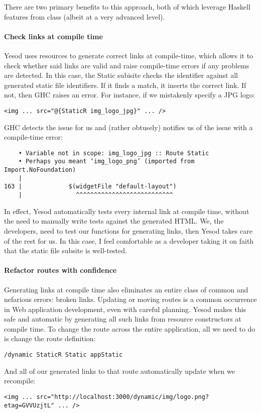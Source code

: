 There are two primary benefits to this approach, both of which leverage Haskell features from class (albeit at a very advanced level).

\paragraph{Check links at compile time} Yesod uses resources to generate correct links at compile-time, which allows it to check whether said links are valid and raise compile-time errors if any problems are detected. In this case, the Static subisite checks the identifier  against all generated static file identifiers. If it finds a match, it inserts the correct link. If not, then GHC raises an error. For instance, if we mistakenly specify a JPG logo:

\begin{Verbatim}
<img ... src="@{StaticR img_logo_jpg}" ... />
\end{Verbatim}

GHC detects the issue for us and (rather obtusely) notifies us of the issue with a compile-time error:

\begin{Verbatim}
    • Variable not in scope: img_logo_jpg :: Route Static
    • Perhaps you meant ‘img_logo_png’ (imported from Import.NoFoundation)
    |
163 |             $(widgetFile "default-layout")
    |               ^^^^^^^^^^^^^^^^^^^^^^^^^^^
\end{Verbatim}

In effect, Yesod automatically tests every internal link at compile time, without the need to manually write tests against the generated HTML. We, the developers, need to test our functions for generating links, then Yesod takes care of the rest for us. In this case, I feel comfortable as a developer taking it on faith that the static file subsite is well-tested.

\paragraph{Refactor routes with confidence} Generating links at compile time also eliminates an entire class of common and nefarious errors: broken links. Updating or moving routes is a common occurrence in Web application development, even with careful planning. Yesod makes this safe and automatic by generating all such links from resource constructors at compile time. To change the route across the entire application, all we need to do is change the route definition:

\begin{Verbatim}
/dynamic StaticR Static appStatic
\end{Verbatim}

And all of our generated links to that route automatically update when we recompile:

\begin{Verbatim}
<img ... src="http://localhost:3000/dynamic/img/logo.png?etag=GVVUzjtL" ... />
\end{Verbatim}


